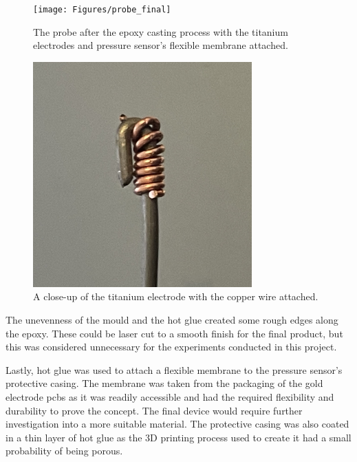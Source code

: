 \begin{figure}[ht]
    \begin{minipage}{0.5\textwidth}
        \centering
        \texttt{[image: Figures/probe\_final]}
        \caption{The probe after the epoxy casting process with the titanium electrodes and pressure sensor's flexible membrane attached.}
        \label{fig:probe-final} %
    \end{minipage}
    \begin{minipage}{0.5\textwidth}
        \centering
        \includegraphics[width=0.75\textwidth]{Figures/titanium_electrode}
        \caption{A close-up of the titanium electrode with the copper wire attached.}
        \label{fig:titanium-electrodes} %
    \end{minipage}
\end{figure}

The unevenness of the mould and the hot glue created some rough edges along the epoxy.
These could be laser cut to a smooth finish for the final product, but this was considered unnecessary for the experiments conducted in this project.

Lastly, hot glue was used to attach a flexible membrane to the pressure sensor's protective casing.
The membrane was taken from the packaging of the gold electrode \glspl{pcb} as it was readily accessible and had the required flexibility and durability to prove the concept.
The final device would require further investigation into a more suitable material.
The protective casing was also coated in a thin layer of hot glue as the 3D printing process used to create it had a small probability of being porous.